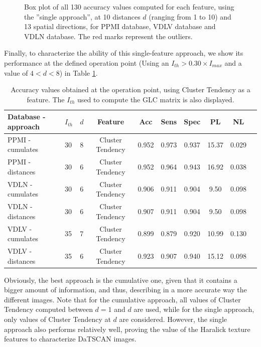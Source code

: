 \begin{figure}
	\caption{Box plot of all 130 accuracy values computed for each feature, using the ''single approach'', at 10 distances $d$ (ranging from 1 to 10) and 13 spatial directions, for \protect{} PPMI database, \protect{} VDLV database and \protect{} VDLN database. The red marks represent the outliers.}
	\label{fig:features_acc_distances}
\end{figure}

Finally, to characterize the ability of this single-feature approach, we show its performance at the defined operation point (Using an $I_{th}>0.30\times I_{max}$ and a value of $4<d<8$) in Table \ref{tab:exp1Acc}.

\begin{table}[htp]
	\centering
	\begin{tabular}{llcccccccc}
		Database - approach & $I_{th}$	& $d$	& Feature	& Acc	& Sens	& Spec	& PL	& NL \\
		\hline\hline
		PPMI - cumulates	& 30	& 8	& Cluster Tendency	& 0.952	& 0.973	& 0.937	& 15.37	& 0.029 	 \\ %
		PPMI - distances	& 30	& 6	& Cluster Tendency	& 0.952	& 0.964	& 0.943	& 16.92	& 0.038 	 \\ %
		\hline
		VDLN - cumulates	& 30	& 6	& Cluster Tendency	& 0.906 & 0.911	& 0.904	& 9.50	& 0.098 	 \\ %
		VDLN - distances	& 30	& 6	& Cluster Tendency	& 0.907	& 0.911	& 0.904	& 9.50	& 0.098 	 \\ %
		\hline
		VDLV - cumulates	& 35	& 7	& Cluster Tendency	& 0.899 & 0.879	& 0.920	& 10.99	& 0.130 	 \\ %
		VDLV - distances	& 35	& 6	& Cluster Tendency	&  0.923	& 0.907	& 0.940	& 15.12	& 0.098 	 \\ %
		\hline\hline
	\end{tabular}
	\caption{Accuracy values obtained at the operation point, using Cluster Tendency as a feature. The $I_{th}$ used to compute the GLC matrix is also displayed. }
	\label{tab:exp1Acc}
\end{table}

Obviously, the best approach is the cumulative one, given that it contains a bigger amount of information, and thus, describing in a more accurate way the different images. Note that for the cumulative approach, all values of Cluster Tendency computed between $d=1$ and $d$ are used, while for the single approach, only values of Cluster Tendency at $d$ are considered. However, the single approach also performs relatively well, proving the value of the Haralick texture features to characterize DaTSCAN images. 

